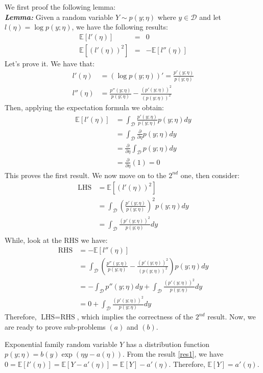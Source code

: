 \begin{answer}
We first proof the following lemma: \\
\textbf{\textit{Lemma:}} Given a random variable $Y \sim p(y; \eta)$ where $y \in \mathcal{D}$ and let $l(\eta) = \log p(y; \eta)$, we have the following results:
\begin{eqnarray}
	\mathbb{E}[l'(\eta)] &=& 0 \label{res1}\\
	\mathbb{E}[(l'(\eta))^2] &=& - \mathbb{E}[l''(\eta)] \label{res2}
\end{eqnarray}
Let's prove it. We have that:
\begin{align} 
	l'(\eta) &= (\log p(y; \eta))' = \frac{p'(y; \eta)}{p(y; \eta)} \\
	l''(\eta) &= \frac{p''(y; \eta)}{p(y; \eta)} - \frac{(p'(y; \eta))^2}{(p(y; \eta))^2}
\end{align}
Then, applying the expectation formula we obtain:
\begin{align}
	\mathbb{E}[l'(\eta)] &= \int_\mathcal{D} \frac{p'(y; \eta)}{p(y; \eta)} p(y; \eta)dy \\
	&= \int_\mathcal{D} \frac{\partial}{\partial \eta} p(y; \eta) dy \\
	&= \frac{\partial}{\partial \eta} \int_\mathcal{D} p(y; \eta) dy \\
	&= \frac{\partial}{\partial \eta} (1) = 0
\end{align}
This proves the first result. We now move on to the $2^{nd}$ one, then consider:
\begin{align}
	\text{LHS} &= \mathbb{E}[(l'(\eta))^2] \\
	&= \int_\mathcal{D} \left( \frac{p'(y; \eta)}{p(y; \eta)} \right)^2 p(y; \eta) dy \\
	&= \int_\mathcal{D} \frac{(p'(y; \eta))^2}{p(y; \eta)} dy \\
\end{align}
While, look at the RHS we have:
\begin{align}
	\text{RHS} &= - \mathbb{E}[l''(\eta)] \\
	&= \int_\mathcal{D} \left( \frac{p''(y; \eta)}{p(y; \eta)} - \frac{(p'(y; \eta))^2}{(p(y; \eta))^2} \right) p(y; \eta) dy \\
	&= - \int_\mathcal{D} p''(y; \eta) dy +  \int_\mathcal{D} \frac{(p'(y; \eta))^2}{p(y; \eta)} dy \\
	&= 0 + \int_\mathcal{D} \frac{(p'(y; \eta))^2}{p(y; \eta)} dy
\end{align}
Therefore, $\text{LHS} = \text{RHS}$, which implies the correctness of the $2^{nd}$ result. Now, we are ready to prove sub-problems $(a)$ and $(b)$.

Exponential family random variable $Y$ has a distribution function $p(y; \eta) = b(y) \exp(\eta y - a(\eta))$.
From the result \eqref{res1}, we have $0 = \mathbb{E}[l'(\eta)] = \mathbb{E}[Y - a'(\eta)] = \mathbb{E}[Y] - a'(\eta)$. Therefore, $\mathbb{E}[Y] = a'(\eta)$. \\
\end{answer}

